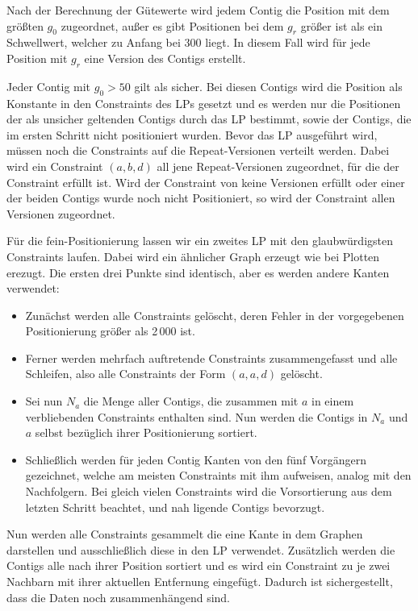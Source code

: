 Nach der Berechnung der Gütewerte wird jedem Contig die Position mit dem größten $g_0$ zugeordnet, außer es gibt Positionen bei dem $g_r$ größer ist als ein Schwellwert, welcher zu Anfang bei 300 liegt. In diesem Fall wird für jede Position mit $g_r$ eine Version des Contigs erstellt.

Jeder Contig mit $g_0 > 50$ gilt als sicher. Bei diesen Contigs wird die Position als Konstante in den Constraints des LPs gesetzt und es werden nur die Positionen der als unsicher geltenden Contigs durch das LP bestimmt, sowie der Contigs, die im ersten Schritt nicht positioniert wurden. Bevor das LP ausgeführt wird, müssen noch die Constraints auf die Repeat-Versionen verteilt werden. 
Dabei wird ein Constraint $(a,b,d)$ all jene Repeat-Versionen zugeordnet, für die der Constraint erfüllt ist. Wird der Constraint von keine Versionen erfüllt oder einer der beiden Contigs wurde noch nicht Positioniert, so wird der Constraint allen Versionen zugeordnet.

Für die fein-Positionierung lassen wir ein zweites LP mit den glaubwürdigsten Constraints laufen. Dabei wird ein ähnlicher Graph erzeugt wie bei Plotten erezugt. Die ersten drei Punkte sind identisch, aber es werden andere Kanten verwendet:
\begin{itemize}
\item Zunächst werden alle Constraints gelöscht, deren Fehler in der vorgegebenen Positionierung größer als 2\,000 ist.
\item Ferner werden mehrfach auftretende Constraints zusammengefasst und alle Schleifen, also alle Constraints der Form $(a, a, d)$ gelöscht.
\item Sei nun $N_a$ die Menge aller Contigs, die zusammen mit $a$ in einem verbliebenden Constraints enthalten sind. Nun werden die Contigs in $N_a$ und $a$ selbst bezüglich ihrer Positionierung sortiert.
\item Schließlich werden für jeden Contig Kanten von den fünf Vorgängern gezeichnet, welche am meisten Constraints mit ihm aufweisen, analog  mit den Nachfolgern. Bei gleich vielen Constraints wird die Vorsortierung aus dem letzten Schritt beachtet, und nah ligende Contigs bevorzugt.
\end{itemize}
Nun werden alle Constraints gesammelt die eine Kante in dem Graphen darstellen und ausschließlich diese in den LP verwendet.
Zusätzlich werden die Contigs alle nach ihrer Position sortiert und es wird ein Constraint zu je zwei Nachbarn mit ihrer aktuellen Entfernung eingefügt. Dadurch ist sichergestellt, dass die Daten noch zusammenhängend sind. 

